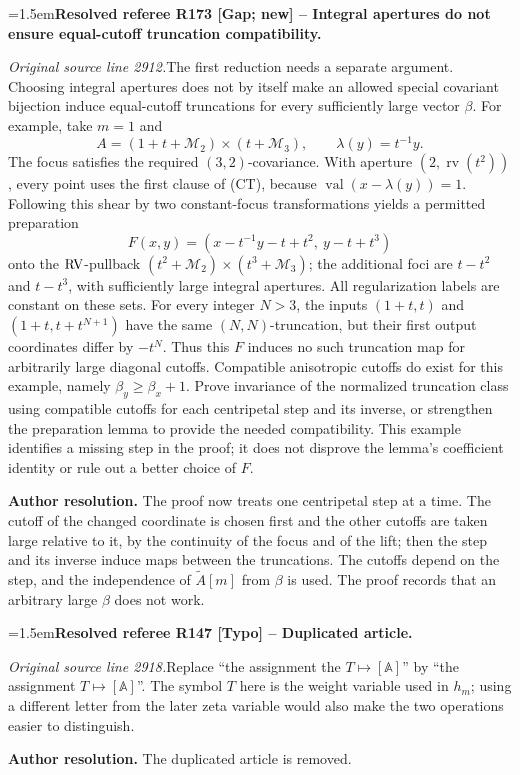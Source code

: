 \documentclass[12pt]{amsart}
\newcommand{\ResolvedRefereeRemark}[5]{%
  \par\medskip\begingroup\normalfont\small\color{gray}%
  \emergencystretch=1.5em\noindent\textbf{Resolved referee R#1 [#2] -- #3.}\par\nobreak\noindent #4\par
  \medskip\color{ResolutionGreen}\noindent\textbf{Author resolution.} #5\par
  \endgroup\medskip
}
\theoremstyle{plain}
\theoremstyle{definition}
\theoremstyle{remark}
\numberwithin{equation}{section}
\theoremstyle{plain}
\newcommand{\RV}{\textup{RV}}
\newcommand{\MM}{\mdl M}
\newcommand{\A}{\mathds{A}}
\newcommand{\0}{\emptyset}
\newcommand{\mdl}[1]{\mathcal{#1}}  %
\newcommand{\efun}{\longmapsto}
\DeclareMathOperator{\rv}{rv}
\DeclareMathOperator{\vv}{val}
\begin{document}
\ResolvedRefereeRemark{173}{Gap; new}{Integral apertures do not ensure equal-cutoff truncation compatibility}{%
\textit{Original source line 2912.}\quad The first reduction needs a separate argument. Choosing integral apertures does not by itself make an allowed special covariant bijection induce equal-cutoff truncations for every sufficiently large vector $\beta$. For example, take $m=1$ and
\[
 A=(1+t+\MM_2)\times(t+\MM_3),\qquad \lambda(y)=t^{-1}y.
\]
The focus satisfies the required $(3,2)$-covariance. With aperture $(2,\rv(t^2))$, every point uses the first clause of (CT), because $\vv(x-\lambda(y))=1$. Following this shear by two constant-focus transformations yields a permitted preparation
\[
 F(x,y)=(x-t^{-1}y-t+t^2,\ y-t+t^3)
\]
onto the $\RV$-pullback $(t^2+\MM_2)\times(t^3+\MM_3)$; the additional foci are $t-t^2$ and $t-t^3$, with sufficiently large integral apertures. All regularization labels are constant on these sets. For every integer $N>3$, the inputs $(1+t,t)$ and $(1+t,t+t^{N+1})$ have the same $(N,N)$-truncation, but their first output coordinates differ by $-t^N$. Thus this $F$ induces no such truncation map for arbitrarily large diagonal cutoffs. Compatible anisotropic cutoffs do exist for this example, namely $\beta_y\geq\beta_x+1$. Prove invariance of the normalized truncation class using compatible cutoffs for each centripetal step and its inverse, or strengthen the preparation lemma to provide the needed compatibility. This example identifies a missing step in the proof; it does not disprove the lemma's coefficient identity or rule out a better choice of $F$.
}{The proof now treats one centripetal step at a time. The cutoff of the changed coordinate is chosen first and the other cutoffs are taken large relative to it, by the continuity of the focus and of the lift; then the step and its inverse induce maps between the truncations. The cutoffs depend on the step, and the independence of $\tilde A[m]$ from $\beta$ is used. The proof records that an arbitrary large $\beta$ does not work.}


\ResolvedRefereeRemark{147}{Typo}{Duplicated article}{%
\textit{Original source line 2918.}\quad Replace ``the assignment the $T\efun[\A]$'' by ``the assignment $T\efun[\A]$''. The symbol $T$ here is the weight variable used in $h_m$; using a different letter from the later zeta variable would also make the two operations easier to distinguish.
}{The duplicated article is removed.}
\end{document}
